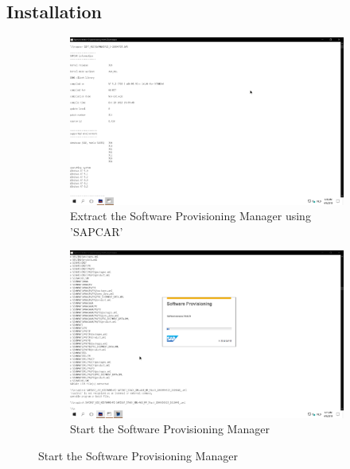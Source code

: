 \subsection{Installation}
\begin{figure}[!htb]\ContinuedFloat
    \begin{subfigure}{0.5\textwidth}
        \captionsetup{width=0.8\linewidth}
        \includegraphics[width=0.9\linewidth]{img/Methodologie/SAP38.png}
        \centering
        \caption{Extract the Software Provisioning Manager using 'SAPCAR'}
    \end{subfigure}
    \begin{subfigure}{0.5\textwidth}
        \captionsetup{width=0.8\linewidth}
        \includegraphics[width=0.9\linewidth]{img/Methodologie/SAP37.png} 
        \centering
        \caption{Start the Software Provisioning Manager}
    \end{subfigure}
\end{figure}
